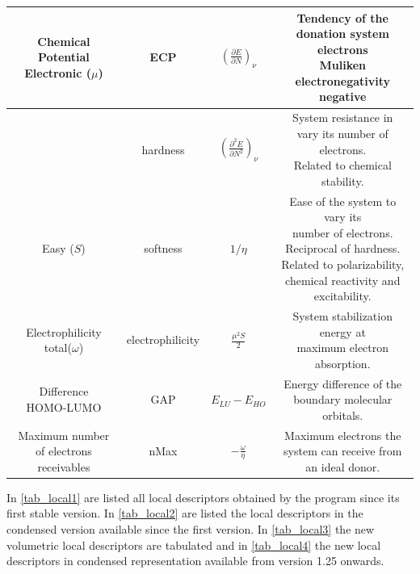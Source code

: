 \documentclass[a4paper,11pt]{refart}
\begin{document}
\begin{minipage}{\fullwidth}
\begin{table}[H]
\begin{tabular}{c|c|c|c}
			\makecell{Chemical Potential\\Electronic ($\mu$) } & ECP & $\left(\frac{\partial E}{\partial N} \right)_\nu$ & \makecell{Tendency of the donation system electrons\\Muliken electronegativity negative}\\\hline
			\makecell{Hardness ($\eta$)} & hardness & $\left(\frac{\partial ^2 E}{\partial N ^2} \right)_\nu$ & \makecell{System resistance in \\vary its number of electrons. \\Related to chemical stability.} \\ \hline
			Easy ($S$) & softness & $1/\eta$ & \makecell{Ease of the system to vary its\\ number of electrons. Reciprocal of hardness.\\ Related to polarizability,\\ chemical reactivity and excitability.} \\ \hline
			\makecell{Electrophilicity\\total($\omega$)} & electrophilicity & $\frac{\mu^2S}{2}$ & \makecell{ System stabilization energy at \\maximum electron absorption.} \\ \hline
			\makecell{Difference\\HOMO-LUMO} & GAP & $E_{LU} - E_{HO}$ & \makecell{Energy difference of the \\boundary molecular orbitals.} \\\hline
			\makecell{Maximum number\\of electrons\\receivables} & nMax & $-\frac{\omega}{\eta}$ & \makecell{Maximum electrons the\\ system can receive from an ideal donor.} \\
			\bottomrule
		\end{tabular}
		\label{tab_glob}
	\end{table}
\end{minipage}

\newpage

In \autoref{tab_local1} are listed all local descriptors obtained by the program since its first stable version. 
In \autoref{tab_local2} are listed the local descriptors in the condensed version available since the first version. In \autoref{tab_local3} the new volumetric local descriptors are tabulated and in \autoref{tab_local4} the new local descriptors in condensed representation available from version 1.25 onwards.
\end{document}
